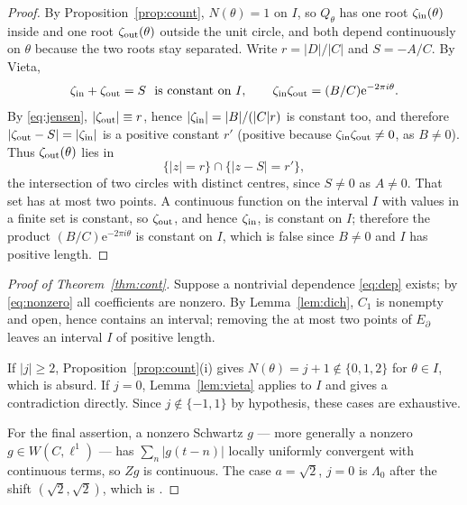 \documentclass[11pt]{amsart}
\theoremstyle{remark}
\newcommand{\e}{\mathrm e}
\begin{document}
\begin{proof}
By Proposition~\ref{prop:count}, $N(\theta)=1$ on $I$, so $Q_\theta$ has one root
$\zeta_{\rm in}(\theta)$ inside and one root $\zeta_{\rm out}(\theta)$ outside the unit circle,
and both depend continuously on $\theta$ because the two roots stay separated. Write
$r=|D|/|C|$ and $S=-A/C$. By Vieta,
\[
\zeta_{\rm in}+\zeta_{\rm out}=S\ \text{ is constant on }I,\qquad
\zeta_{\rm in}\zeta_{\rm out}=(B/C)\e^{-2\pi i\theta} .
\]
By \eqref{eq:jensen}, $|\zeta_{\rm out}|\equiv r$, hence $|\zeta_{\rm in}|=|B|/(|C|r)$ is
constant too, and therefore $|\zeta_{\rm out}-S|=|\zeta_{\rm in}|$ is a positive constant $r'$
(positive because $\zeta_{\rm in}\zeta_{\rm out}\neq0$, as $B\neq0$). Thus
$\zeta_{\rm out}(\theta)$ lies in
\[
\{|z|=r\}\cap\{|z-S|=r'\} ,
\]
the intersection of two circles with distinct centres, since $S\neq0$ as $A\neq0$. That set
has at most two points. A continuous function on the interval $I$ with values in a finite set
is constant, so $\zeta_{\rm out}$, and hence $\zeta_{\rm in}$, is constant on $I$; therefore
the product $(B/C)\e^{-2\pi i\theta}$ is constant on $I$, which is false since $B\neq0$ and $I$
has positive length.
\end{proof}

\begin{proof}[Proof of Theorem~\ref{thm:cont}]
Suppose a nontrivial dependence \eqref{eq:dep} exists; by \eqref{eq:nonzero} all coefficients
are nonzero. By Lemma~\ref{lem:dich}, $C_1$ is nonempty and open, hence contains an interval;
removing the at most two points of $E_\partial$ leaves an interval $I$ of positive length.

If $|j|\geq2$, Proposition~\ref{prop:count}(i) gives $N(\theta)=j+1\notin\{0,1,2\}$ for
$\theta\in I$, which is absurd. If $j=0$, Lemma~\ref{lem:vieta} applies to $I$ and gives a
contradiction directly. Since $j\notin\{-1,1\}$ by hypothesis, these cases are exhaustive.

For the final assertion, a nonzero Schwartz $g$ --- more generally a nonzero
$g\in W(C,\ell^1)$ --- has $\sum_n|g(t-n)|$ locally uniformly convergent with continuous
terms, so $Zg$ is continuous. The case $a=\sqrt2$, $j=0$ is $\Lambda_0$ after the shift
$(\sqrt2,\sqrt2)$, which is \cite[Conjecture~2]{HS}.
\end{proof}
\end{document}
